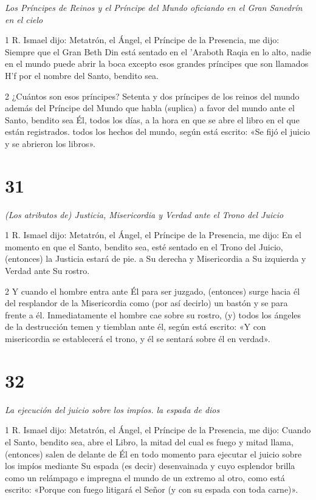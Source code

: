 \par \textit{Los Príncipes de Reinos y el Príncipe del Mundo oficiando en el Gran Sanedrín en el cielo}

\par 1 R. Ismael dijo: Metatrón, el Ángel, el Príncipe de la Presencia, me dijo: Siempre que el Gran Beth Din está sentado en el 'Araboth Raqia en lo alto, nadie en el mundo puede abrir la boca excepto esos grandes príncipes que son llamados H'f por el nombre del Santo, bendito sea.

\par 2 ¿Cuántos son esos príncipes? Setenta y dos príncipes de los reinos del mundo además del Príncipe del Mundo que habla (suplica) a favor del mundo ante el Santo, bendito sea Él, todos los días, a la hora en que se abre el libro en el que están registrados. todos los hechos del mundo, según está escrito: «Se fijó el juicio y se abrieron los libros».

\chapter{31}

\par \textit{(Los atributos de) Justicia, Misericordia y Verdad ante el Trono del Juicio}

\par 1 R. Ismael dijo: Metatrón, el Ángel, el Príncipe de la Presencia, me dijo: En el momento en que el Santo, bendito sea, esté sentado en el Trono del Juicio, (entonces) la Justicia estará de pie. a Su derecha y Misericordia a Su izquierda y Verdad ante Su rostro.

\par 2 Y cuando el hombre entra ante Él para ser juzgado, (entonces) surge hacia él del resplandor de la Misericordia como (por así decirlo) un bastón y se para frente a él. Inmediatamente el hombre cae sobre su rostro, (y) todos los ángeles de la destrucción temen y tiemblan ante él, según está escrito: «Y con misericordia se establecerá el trono, y él se sentará sobre él en verdad».

\chapter{32}

\par \textit{La ejecución del juicio sobre los impíos. la espada de dios}

\par 1 R. Ismael dijo: Metatrón, el Ángel, el Príncipe de la Presencia, me dijo: Cuando el Santo, bendito sea, abre el Libro, la mitad del cual es fuego y mitad llama, (entonces) salen de delante de Él en todo momento para ejecutar el juicio sobre los impíos mediante Su espada (es decir) desenvainada y cuyo esplendor brilla como un relámpago e impregna el mundo de un extremo al otro, como está escrito: «Porque con fuego litigará el Señor (y con su espada con toda carne)».

